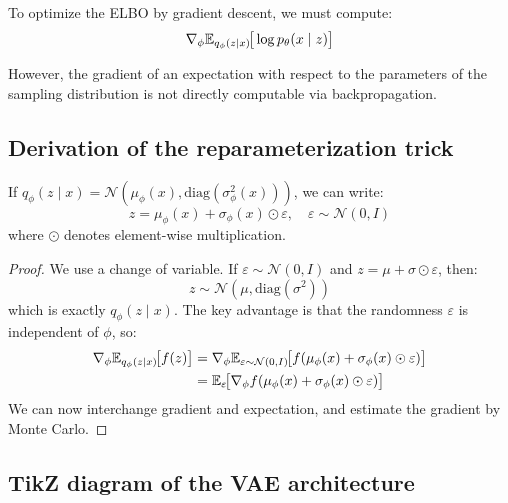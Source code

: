 To optimize the ELBO by gradient descent, we must compute:
\begin{equation}
\nabla_\phi \mathbb{E}_{q_\phi(z|x)}\!\big[\log p_\theta(x \mid z)\big]
\end{equation}

However, the gradient of an expectation with respect to the parameters of the sampling distribution is not directly computable via backpropagation.

\subsection{Derivation of the reparameterization trick}

\begin{theorem}
If $q_\phi(z \mid x) = \mathcal{N}(\mu_\phi(x), \text{diag}(\sigma^2_\phi(x)))$, we can write:
\begin{equation}
z = \mu_\phi(x) + \sigma_\phi(x) \odot \varepsilon, \quad \varepsilon \sim \mathcal{N}(0, I)
\label{eq:reparam}
\end{equation}
where $\odot$ denotes element-wise multiplication.
\end{theorem}

\begin{proof}
We use a change of variable. If $\varepsilon \sim \mathcal{N}(0, I)$ and $z = \mu + \sigma \odot \varepsilon$, then:
\begin{equation}
z \sim \mathcal{N}(\mu, \text{diag}(\sigma^2))
\end{equation}
which is exactly $q_\phi(z \mid x)$. The key advantage is that the randomness $\varepsilon$ is independent of $\phi$, so:
\begin{align}
\nabla_\phi \mathbb{E}_{q_\phi(z|x)}\!\big[f(z)\big] &= \nabla_\phi \mathbb{E}_{\varepsilon \sim \mathcal{N}(0,I)}\!\big[f(\mu_\phi(x) + \sigma_\phi(x) \odot \varepsilon)\big] \\
&= \mathbb{E}_{\varepsilon}\!\big[\nabla_\phi f(\mu_\phi(x) + \sigma_\phi(x) \odot \varepsilon)\big]
\end{align}
We can now interchange gradient and expectation, and estimate the gradient by Monte Carlo.
\end{proof}

\subsection{TikZ diagram of the VAE architecture}

